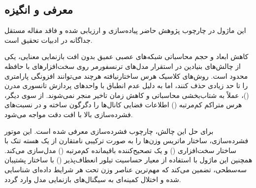 \subsection{معرفی و انگیزه}
این ماژول در چارچوب پژوهش حاضر پیاده‌سازی و ارزیابی شده و فاقد مقاله مستقل جداگانه در ادبیات تحقیق است.

کاهش ابعاد و حجم محاسباتی شبکه‌های عصبی عمیق بدون افت بازنمایی معنایی، یکی از چالش‌های بنیادین در استقرار مدل‌های ترنسفورمر روی سخت‌افزارهای با حافظه محدود است. روش‌های کلاسیک هرس ساختارنیافته هرچند می‌توانند افزونگی پارامتری را تا حد زیادی حذف کنند، اما به دلیل عدم انطباق با واحدهای پردازش تانسوری مدرن ()، عملاً به شتاب‌بخشی محاسباتی و کاهش زمان تاخیر منجر نمی‌شوند. از سوی دیگر، هرس متراکم کم‌مرتبه () اطلاعات فضایی کانال‌ها را دگرگون ساخته و در نسبت‌های فشرده‌سازی بالا با افت دقت مواجه می‌شود.

برای حل این چالش، چارچوب فشرده‌سازی  معرفی شده است. این موتور فشرده‌سازی، ساختار ماتریس وزن‌ها را به صورت ترکیبی نامتقارن از یک هسته تنک با ساختار سخت‌افزاری  () و یک تصحیح‌کننده باقیمانده کم‌مرتبه () مدل‌سازی می‌کند. همچنین این ماژول با استفاده از معیار حساسیت تیلور انعطاف‌پذیر () با ساختار پشتیبان سه‌سطحی، تضمین می‌کند که مهم‌ترین عناصر وزن تحت هر شرایط داده‌ای شناسایی شده و اختلال کمینه‌ای به سیگنال‌های بازنمایی مدل وارد گردد.
